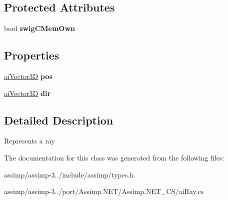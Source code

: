 \subsection*{Protected Attributes}
\begin{DoxyCompactItemize}
\item 
\hypertarget{structai_ray_a57f2ac12a030faee709574feec6499a7}{bool {\bfseries swig\+C\+Mem\+Own}}\label{structai_ray_a57f2ac12a030faee709574feec6499a7}

\end{DoxyCompactItemize}
\subsection*{Properties}
\begin{DoxyCompactItemize}
\item 
\hypertarget{structai_ray_a351fa36a5012d82f81c01de4b415fd9c}{\hyperlink{structai_vector3_d}{ai\+Vector3\+D} {\bfseries pos}}\label{structai_ray_a351fa36a5012d82f81c01de4b415fd9c}

\item 
\hypertarget{structai_ray_a3234eb9436dee36370c769d7de907a63}{\hyperlink{structai_vector3_d}{ai\+Vector3\+D} {\bfseries dir}}\label{structai_ray_a3234eb9436dee36370c769d7de907a63}

\end{DoxyCompactItemize}


\subsection{Detailed Description}
Represents a ray 

The documentation for this class was generated from the following files\+:\begin{DoxyCompactItemize}
\item 
assimp/assimp-\/3../include/assimp/types.\+h\item 
assimp/assimp-\/3../port/\+Assimp.\+N\+E\+T/\+Assimp.\+N\+E\+T\+\_\+\+C\+S/ai\+Ray.\+cs\end{DoxyCompactItemize}
